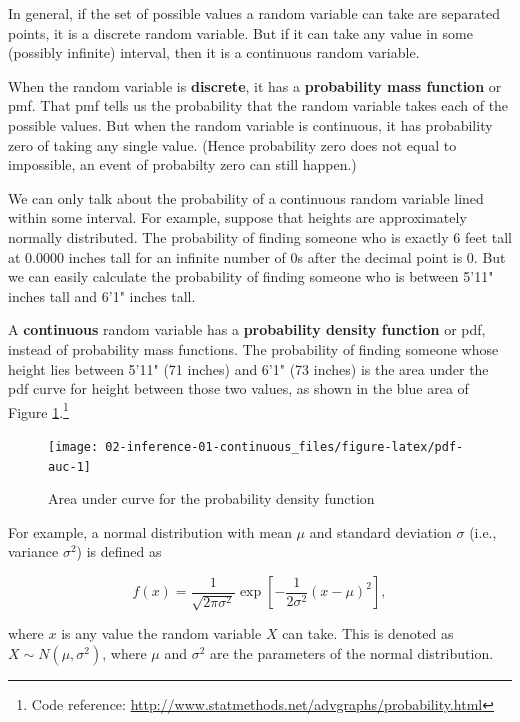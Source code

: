 \documentclass[]{book}
\let\rmarkdownfootnote\footnote%
\def\footnote{\protect\rmarkdownfootnote}
\theoremstyle{definition}
\theoremstyle{definition}
\theoremstyle{definition}
\theoremstyle{remark}
\begin{document}
In general, if the set of possible values a random variable can take are
separated points, it is a discrete random variable. But if it can take
any value in some (possibly infinite) interval, then it is a continuous
random variable.

When the random variable is \textbf{discrete}, it has a
\textbf{probability mass function} or pmf. That pmf tells us the
probability that the random variable takes each of the possible values.
But when the random variable is continuous, it has probability zero of
taking any single value. (Hence probability zero does not equal to
impossible, an event of probabilty zero can still happen.)

We can only talk about the probability of a continuous random variable
lined within some interval. For example, suppose that heights are
approximately normally distributed. The probability of finding someone
who is exactly 6 feet tall at 0.0000 inches tall for an infinite number
of 0s after the decimal point is 0. But we can easily calculate the
probability of finding someone who is between 5'11" inches tall and 6'1"
inches tall.

A \textbf{continuous} random variable has a \textbf{probability density
function} or pdf, instead of probability mass functions. The probability
of finding someone whose height lies between 5'11" (71 inches) and 6'1"
(73 inches) is the area under the pdf curve for height between those two
values, as shown in the blue area of Figure \ref{fig:pdf-auc}.\footnote{Code
  reference: \url{http://www.statmethods.net/advgraphs/probability.html}}

\begin{figure}

{\centering \texttt{[image: 02-inference-01-continuous\_files/figure-latex/pdf-auc-1]} 

}

\caption{Area under curve for the probability density function}\label{fig:pdf-auc}
\end{figure}

For example, a normal distribution with mean \(\mu\) and standard
deviation \(\sigma\) (i.e., variance \(\sigma^2\)) is defined as

\[f(x) = \frac{1}{\sqrt{2 \pi \sigma^2}} \exp[-\frac{1}{2\sigma^2}(x-\mu)^2],\]

where \(x\) is any value the random variable \(X\) can take. This is
denoted as \(X \sim N(\mu,\sigma^2)\), where \(\mu\) and \(\sigma^2\)
are the parameters of the normal distribution.
\end{document}
